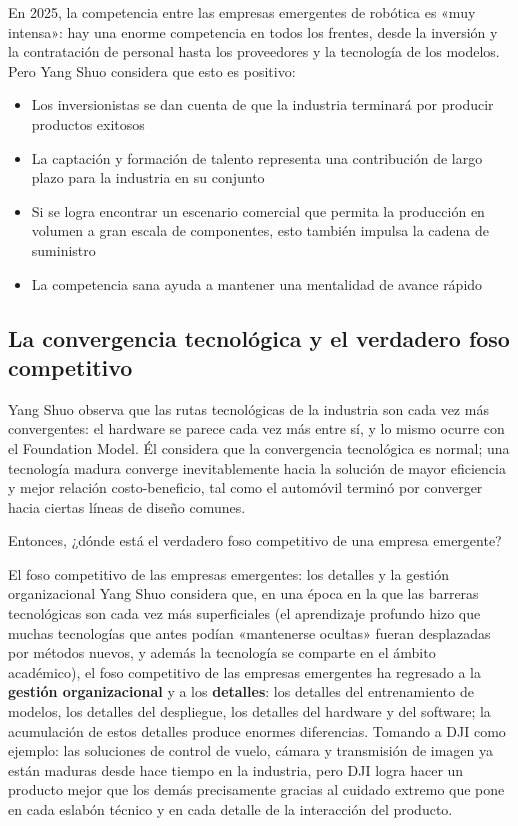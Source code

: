 \documentclass[a4paper]{article}
\begin{document}
En 2025, la competencia entre las empresas emergentes de robótica es «muy intensa»: hay una enorme competencia en todos los frentes, desde la inversión y la contratación de personal hasta los proveedores y la tecnología de los modelos. Pero Yang Shuo considera que esto es positivo:

\begin{itemize}
    \item Los inversionistas se dan cuenta de que la industria terminará por producir productos exitosos
    \item La captación y formación de talento representa una contribución de largo plazo para la industria en su conjunto
    \item Si se logra encontrar un escenario comercial que permita la producción en volumen a gran escala de componentes, esto también impulsa la cadena de suministro
    \item La competencia sana ayuda a mantener una mentalidad de avance rápido
\end{itemize}

\subsection{La convergencia tecnológica y el verdadero foso competitivo}

Yang Shuo observa que las rutas tecnológicas de la industria son cada vez más convergentes: el hardware se parece cada vez más entre sí, y lo mismo ocurre con el Foundation Model. Él considera que la convergencia tecnológica es normal; una tecnología madura converge inevitablemente hacia la solución de mayor eficiencia y mejor relación costo-beneficio, tal como el automóvil terminó por converger hacia ciertas líneas de diseño comunes.

Entonces, ¿dónde está el verdadero foso competitivo de una empresa emergente?

\begin{importantbox}{El foso competitivo de las empresas emergentes: los detalles y la gestión organizacional}
Yang Shuo considera que, en una época en la que las barreras tecnológicas son cada vez más superficiales (el aprendizaje profundo hizo que muchas tecnologías que antes podían «mantenerse ocultas» fueran desplazadas por métodos nuevos, y además la tecnología se comparte en el ámbito académico), el foso competitivo de las empresas emergentes ha regresado a la \textbf{gestión organizacional} y a los \textbf{detalles}: los detalles del entrenamiento de modelos, los detalles del despliegue, los detalles del hardware y del software; la acumulación de estos detalles produce enormes diferencias. Tomando a DJI como ejemplo: las soluciones de control de vuelo, cámara y transmisión de imagen ya están maduras desde hace tiempo en la industria, pero DJI logra hacer un producto mejor que los demás precisamente gracias al cuidado extremo que pone en cada eslabón técnico y en cada detalle de la interacción del producto.
\end{importantbox}
\end{document}
